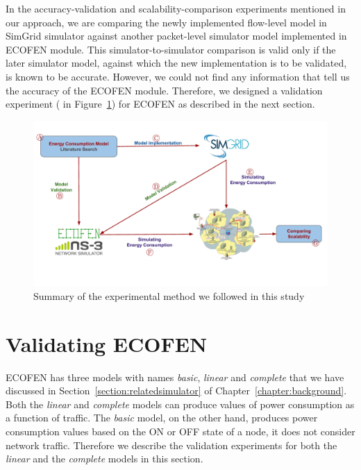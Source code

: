 In the accuracy-validation and scalability-comparison experiments mentioned in our approach, we are comparing the newly implemented flow-level model in SimGrid simulator against another packet-level simulator model implemented in ECOFEN module. This simulator-to-simulator comparison is valid only if the later simulator model, against which the new implementation is to be validated, is known to be accurate. However, we could not find any information that tell us the accuracy of the ECOFEN module. Therefore, we designed a validation experiment ( in Figure~\ref{fig:approach}) for ECOFEN as described in the next section. 
\begin{figure}[ht]
	\begin{center}
		\includegraphics[width=13cm]{images/approach.pdf}
		\vspace*{-1.0cm}
		\caption{Summary of the experimental method we followed in this study}
		\label{fig:approach}
	\end{center}
\end{figure}

\section{Validating ECOFEN}
ECOFEN has three models with names \emph{basic}, \emph{linear} and \emph{complete} that we have discussed in Section~\ref{section:relatedsimulator} of Chapter~\ref{chapter:background}. Both the \emph{linear} and \emph{complete} models can produce values of power consumption as a function of traffic. The  \emph{basic} model, on the other hand, produces power consumption values based on the ON or OFF state of a node, it does not consider network traffic. Therefore we describe the validation experiments for both the \emph{linear} and the \emph{complete} models in this section. 
 

